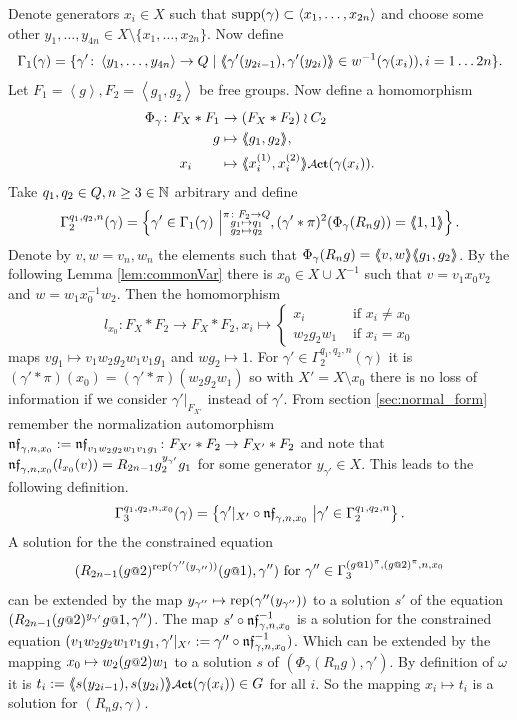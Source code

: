 \documentclass[a4paper,11pt]{amsart}
\begin{document}
 Denote generators $x_i\in X$ such that $\textup{supp}(\gamma) \subset \left<x_1,\ldots,x_{2n}\right>$ and choose some 
 other $y_1,\ldots,y_{4n} \in X \setminus \{x_1,\ldots,x_{2n}\}$. 
 Now define
 \[\Gamma_1(\gamma) = \{\gamma' \colon \left< y_1,\ldots ,y_{4n}\right> \to Q \mid \langle\negthickspace\langle\gamma'(y_{2i-1}),\gamma'(y_{2i})\rangle\negthickspace\rangle\in w^{-1}(\gamma(x_i)),i=1\ldots2n\}.\] 
 Let $F_1=\left<g\right>,F_2=\left<g_1,g_2\right>$ be free groups. 
 Now define a homomorphism  
 \begin{align*}
  \Phi_{\gamma}\colon F_X*F_1 &\to (F_X*F_2)\wr C_2 \\ g&\mapsto \pair{g_1,g_2},\\ x_i\qquad &\mapsto \pair{x_i^{(1)},x_i^{(2)}}\act(\gamma(x_i)).
 \end{align*}
Take $q_1,q_2 \in Q,n\geq3\in \mathbb{N}$ arbitrary and define
 \[\Gamma_2^{q_1,q_2,n}(\gamma) = \left\{\gamma'\in \Gamma_1(\gamma) \ \middle \vert \substack{\pi\colon F_2\to Q\\
										g_1\mapsto q_1 \\
										g_2\mapsto q_2 }, (\gamma'*\pi)^2(\Phi_\gamma(R_ng))=\langle\negthickspace\langle1,1\rangle\negthickspace\rangle\right\}.\] 
 Denote by $v,w=v_n,w_n$ the elements such that $\Phi_\gamma(R_ng)=\langle\negthickspace\langle v,w\rangle\negthickspace\rangle\langle\negthickspace\langle g_1,g_2\rangle\negthickspace\rangle$. By the following Lemma \ref{lem:commonVar} there is 
 $x_0 \in X\cup X^{-1}$ such that $v=v_1x_0v_2$ and $w=w_1x_0^{-1}w_2$. Then the homomorphism
 \[l_{x_0}\colon F_X*F_2\to F_X*F_2, x_i \mapsto \begin{cases}
						x_i &\text{ if } x_i\neq {x_0} \\
						w_2g_2w_1 &\text{ if }x_i= {x_0} 
                                             \end{cases}\]
 maps $vg_1 \mapsto v_1w_2g_2w_1v_1g_1$ and $wg_2\mapsto 1$. 
 For $\gamma'\in \Gamma_2^{q_1,q_2,n}(\gamma)$ it is $(\gamma'*\pi)(x_0)=({\gamma'*\pi})(w_2g_2w_1)$ so with $X'=X\setminus x_0$ there is no loss of information if 
 we consider $\gamma'|_{F_{X'}}$ instead of $\gamma'$.
 From section \ref{sec:normal_form} remember the normalization 
 automorphism $\mathfrak{nf}_{\gamma,n,x_0}:=\mathfrak{nf}_{v_1w_2g_2w_1v_1g_1}\colon F_{X'}*F_2 \to F_{X'}*F_2$
  and note that
 $\mathfrak{nf}_{\gamma,n,x_0}(l_{x_0}(v))=R_{2n-1}g_2^{{y_{\gamma'}}}g_1$ for some generator ${y_{\gamma'}}\in X$.
 This leads to the following definition.
 \[\Gamma_3^{q_1,q_2,n,x_0}(\gamma) = \left\{\gamma'|_{X'} \circ \mathfrak{nf}_{\gamma,n,x_0} \ \middle \vert \gamma' \in \Gamma_2^{q_1,q_2,n} \right\}.\] 
 A solution for the the constrained equation
 \[(R_{2n-1}(g\at2)^{\textup{rep}(\gamma''({y_{\gamma''}}))}(g\at1),\gamma'')\textup{ for }\gamma'' \in \Gamma_3^{(g\at{1})^\pi,(g\at{2})^\pi,n,x_0}\]
 can be 
 extended by the map ${y_{\gamma''}}\mapsto \textup{rep}(\gamma''({y_{\gamma''}}))$ to a solution $s'$ 
 of the equation $(R_{2n-1} (g\at{2})^{{y_{\gamma'}}} g\at{1},\gamma'')$. The map $s'\circ \mathfrak{nf}_{\gamma,n,x_0}^{-1}$ 
 is a solution for the constrained equation $(v_1w_2g_2w_1v_1g_1,\gamma'|_{X'}:=\gamma'' \circ \mathfrak{nf}_{\gamma,n,x_0}^{-1})$.
 Which can be extended by the mapping $x_0\mapsto w_2(g\at{2})w_1$ to a solution $s$ of $(\Phi_\gamma(R_n g),\gamma')$.
 By definition of $\omega$ it is $t_i:=\pair{s(y_{2i-1}),s(y_{2i})}\act(\gamma(x_i)) \in G$ for all $i$. So the mapping $x_i\mapsto t_i$ is a solution for $(R_ng,\gamma)$.
 
\end{document}
